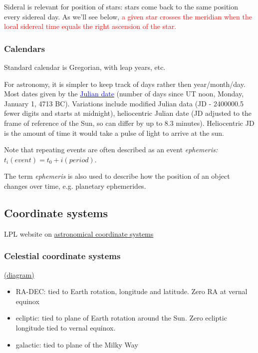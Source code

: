\documentclass[12pt]{article}
\begin{document}
Sideral is relevant for position of stars: stars come back
to the same position every sidereal day. As we'll see
below, \textcolor{red}{a given star crosses the meridian when the
local sidereal time equals the right ascension of the
star.}

\subsubsection*{Calendars}

Standard calendar is Gregorian, with leap years, etc.

For astronomy, it is simpler to keep track of days rather
    then year/month/day. Most dates given by the
    \href{https://en.wikipedia.org/wiki/Julian_day}
    {\textcolor{blue}{Julian date}}
    (number of days since UT noon, Monday,
    January 1, 4713 BC). Variations include modified Julian
    data (JD - 2400000.5 fewer digits and starts at midnight),
    heliocentric Julian date (JD adjusted to the frame of
    reference of the Sun, so can differ by up to 8.3 minutes).
    Heliocentric JD is the amount of time it would take a
    pulse of light to arrive at the sun.

Note that repeating events are often described as an event
    \emph{ephemeris:} $t_i(event) = t_0 + i(period)$.

The term \emph{ephemeris} is also used to describe how the
    position of an object changes over time, e.g. planetary
    ephemerides.

\subsection*{Coordinate systems}
LPL website on \textcolor{blue}
{\href{http://spider.seds.org/spider/ScholarX/coords.html}
{astronomical coordinate systems}}
\subsubsection*{Celestial coordinate systems}
\textcolor{blue}
{\href{http://csep10.phys.utk.edu/astr161/lect/time/coordinates.html}{(diagram)}}
\begin{itemize}
    \item RA-DEC: tied to Earth rotation, longitude and latitude.
        Zero RA at vernal equinox
    \item ecliptic: tied to plane of Earth rotation around the Sun.
        Zero ecliptic longitude tied to vernal equinox.
    \item galactic: tied to plane of the Milky Way
\end{itemize}
\end{document}
